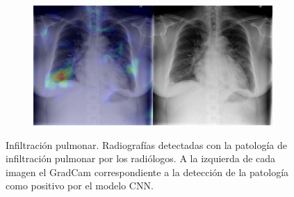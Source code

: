 \begin{figure}[b]
\begin{subfigure}{0.4\textwidth}
    \end{subfigure}
    \begin{subfigure}{0.4\textwidth}
        \centering
        \includegraphics[width=1.0\textwidth]{Chapters/5. Conclusiones/img/Infiltration/1_1_00022215_012.png}
    \end{subfigure}

    \caption{Infiltración pulmonar. Radiografías detectadas con la patología de infiltración pulmonar por los
                    radiólogos. A la izquierda de cada imagen el GradCam correspondiente a la detección
                    de la patología como positivo por el modelo CNN.}
\end{figure}

